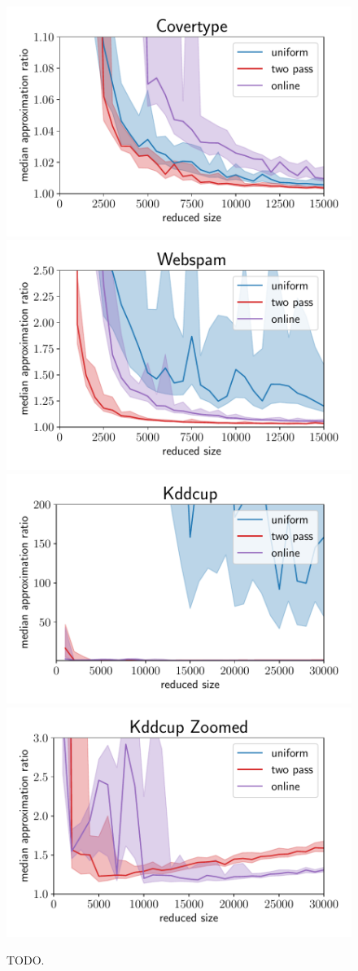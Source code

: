 \begin{figure}[ht!]
    \centering
    \includegraphics[width=.49\linewidth]{figures/covertype_ratio_plot.pdf}
    \includegraphics[width=.49\linewidth]{figures/webspam_ratio_plot.pdf}
    \includegraphics[width=.49\linewidth]{figures/kddcup_ratio_plot.pdf}
    \includegraphics[width=.49\linewidth]{figures/kddcup_ratio_plot_zoomed.pdf}
    \caption{TODO.}
    \label{fig:ratio-plots}
\end{figure}